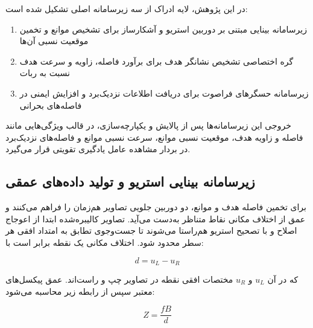 در این پژوهش، لایه ادراک از سه زیرسامانه اصلی تشکیل شده است:
\begin{enumerate}
	\item زیرسامانه بینایی مبتنی بر دوربین استریو و آشکارساز  برای تشخیص موانع و تخمین موقعیت نسبی آن‌ها
	\item گره اختصاصی تشخیص نشانگر هدف برای برآورد فاصله، زاویه و سرعت هدف نسبت به ربات
	\item زیرسامانه حسگرهای فراصوت برای دریافت اطلاعات نزدیک‌برد و افزایش ایمنی در فاصله‌های بحرانی
\end{enumerate}

خروجی این زیرسامانه‌ها پس از پالایش و یکپارچه‌سازی، در قالب ویژگی‌هایی مانند فاصله و زاویه هدف، موقعیت نسبی موانع، سرعت نسبی موانع و فاصله‌های نزدیک‌برد در بردار مشاهده عامل یادگیری تقویتی قرار می‌گیرد.

\subsection{زیرسامانه بینایی استریو و تولید داده‌های عمقی}
\label{subsec:stereo_depth}

برای تخمین فاصله هدف و موانع، دو دوربین جلویی تصاویر هم‌زمان را فراهم می‌کنند و عمق از اختلاف مکانی%
نقاط متناظر به‌دست می‌آید. تصاویر کالیبره‌شده ابتدا از اعوجاج اصلاح و با تصحیح استریو%
هم‌راستا می‌شوند تا جست‌وجوی تطابق به امتداد افقی هر سطر محدود شود. اختلاف مکانی یک نقطه برابر است با:

\begin{equation}
	d = u_L - u_R
	\label{eq:stereo_disparity_main}
\end{equation}

که در آن \(u_L\) و \(u_R\) مختصات افقی نقطه در تصاویر چپ و راست‌اند. عمق پیکسل‌های معتبر سپس از رابطه زیر محاسبه می‌شود:

\begin{equation}
	Z = \frac{fB}{d}
	\label{eq:stereo_depth_basic}
\end{equation}

